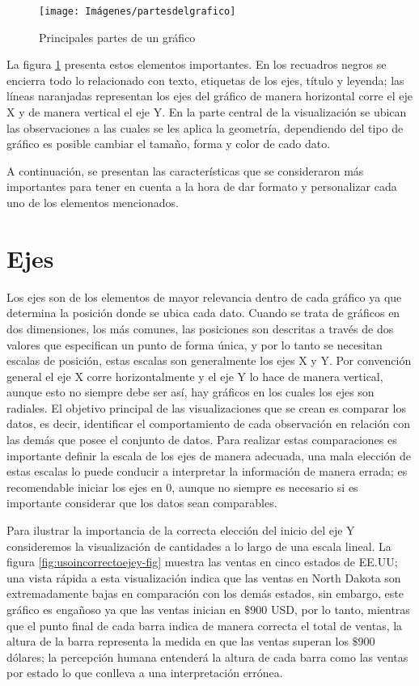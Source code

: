 \documentclass[
]{book}
\begin{document}
\begin{figure}

{\centering \texttt{[image: Imágenes/partesdelgrafico]} 

}

\caption{Principales partes de un gráfico}\label{fig:partesgrafico-fig}
\end{figure}

La figura \ref{fig:partesgrafico-fig} presenta estos elementos importantes. En los recuadros negros se encierra todo lo relacionado con texto, etiquetas de los ejes, título y leyenda; las líneas naranjadas representan los ejes del gráfico de manera horizontal corre el eje X y de manera vertical el eje Y. En la parte central de la visualización se ubican las observaciones a las cuales se les aplica la geometría, dependiendo del tipo de gráfico es posible cambiar el tamaño, forma y color de cado dato.

A continuación, se presentan las características que se consideraron más importantes para tener en cuenta a la hora de dar formato y personalizar cada uno de los elementos mencionados.

\hypertarget{ejes}{%
\section{Ejes}\label{ejes}}

Los ejes son de los elementos de mayor relevancia dentro de cada gráfico ya que determina la posición donde se ubica cada dato. Cuando se trata de gráficos en dos dimensiones, los más comunes, las posiciones son descritas a través de dos valores que especifican un punto de forma única, y por lo tanto se necesitan escalas de posición, estas escalas son generalmente los ejes X y Y. Por convención general el eje X corre horizontalmente y el eje Y lo hace de manera vertical, aunque esto no siempre debe ser así, hay gráficos en los cuales los ejes son radiales.
El objetivo principal de las visualizaciones que se crean es comparar los datos, es decir, identificar el comportamiento de cada observación en relación con las demás que posee el conjunto de datos. Para realizar estas comparaciones es importante definir la escala de los ejes de manera adecuada, una mala elección de estas escalas lo puede conducir a interpretar la información de manera errada; es recomendable iniciar los ejes en 0, aunque no siempre es necesario si es importante considerar que los datos sean comparables.

Para ilustrar la importancia de la correcta elección del inicio del eje Y consideremos la visualización de cantidades a lo largo de una escala lineal. La figura \ref{fig:usoincorrectoejey-fig} muestra las ventas en cinco estados de EE.UU; una vista rápida a esta visualización indica que las ventas en North Dakota son extremadamente bajas en comparación con los demás estados, sin embargo, este gráfico es engañoso ya que las ventas inician en \(\$900\) USD, por lo tanto, mientras que el punto final de cada barra indica de manera correcta el total de ventas, la altura de la barra representa la medida en que las ventas superan los \(\$900\) dólares; la percepción humana entenderá la altura de cada barra como las ventas por estado lo que conlleva a una interpretación errónea.
\end{document}
